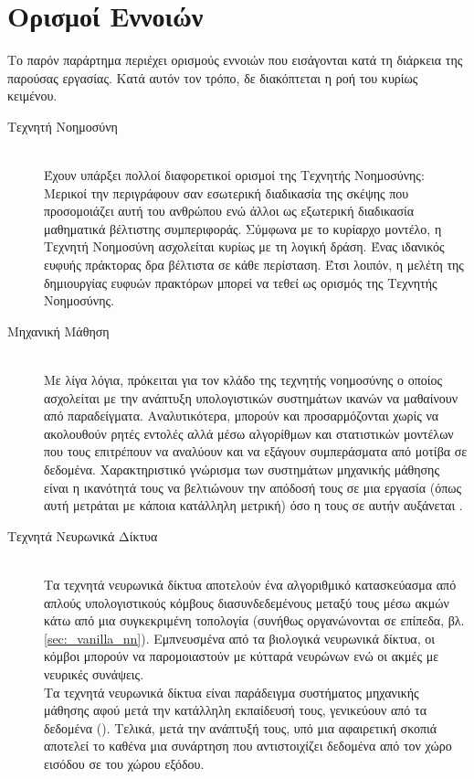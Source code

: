 \chapter{Ορισμοί Εννοιών}
\label{chap:definitions}
Το παρόν παράρτημα περιέχει ορισμούς εννοιών που εισάγονται κατά τη διάρκεια της παρούσας εργασίας. Κατά αυτόν τον τρόπο, δε διακόπτεται η ροή του κυρίως κειμένου. \cite{russell2020artificial,goodfellow2016deep,geron2019hands, bishop2006pattern} 

\begin{description}
    \item[Τεχνητή Νοημοσύνη] \hfill \\ 
    Έχουν υπάρξει πολλοί διαφορετικοί ορισμοί της Τεχνητής Νοημοσύνης: Μερικοί την περιγράφουν σαν εσωτερική διαδικασία της σκέψης που προσομοιάζει αυτή του ανθρώπου ενώ άλλοι ως εξωτερική διαδικασία μαθηματικά βέλτιστης συμπεριφοράς. Σύμφωνα με το κυρίαρχο μοντέλο, η Τεχνητή Νοημοσύνη ασχολείται κυρίως με τη λογική δράση. Ένας ιδανικός ευφυής πράκτορας δρα βέλτιστα σε κάθε περίσταση. Έτσι λοιπόν, η μελέτη της δημιουργίας ευφυών πρακτόρων μπορεί να τεθεί ως ορισμός της Τεχνητής Νοημοσύνης.
    \item[Μηχανική Μάθηση] \hfill \\ 
    Με λίγα λόγια, πρόκειται για τον κλάδο της τεχνητής νοημοσύνης ο οποίος ασχολείται με την ανάπτυξη υπολογιστικών συστημάτων ικανών να μαθαίνουν από παραδείγματα. Αναλυτικότερα, μπορούν και προσαρμόζονται χωρίς να ακολουθούν ρητές εντολές αλλά μέσω αλγορίθμων και στατιστικών μοντέλων που τους επιτρέπουν να αναλύουν και να εξάγουν συμπεράσματα από μοτίβα σε δεδομένα. Χαρακτηριστικό γνώρισμα των συστημάτων μηχανικής μάθησης είναι η ικανότητά τους να βελτιώνουν την απόδοσή τους σε μια εργασία (όπως αυτή μετράται με κάποια κατάλληλη μετρική) όσο η  τους σε αυτήν αυξάνεται \cite{mitchell1997machine}.
    \item[Τεχνητά Νευρωνικά Δίκτυα] \hfill \\ 
    Τα τεχνητά νευρωνικά δίκτυα αποτελούν ένα αλγοριθμικό κατασκεύασμα από απλούς υπολογιστικούς κόμβους διασυνδεδεμένους μεταξύ τους μέσω ακμών κάτω από μια συγκεκριμένη τοπολογία (συνήθως οργανώνονται σε επίπεδα, βλ. \ref{sec:_vanilla_nn}). Εμπνευσμένα από τα βιολογικά νευρωνικά δίκτυα, οι κόμβοι μπορούν να παρομοιαστούν με κύτταρά νευρώνων ενώ οι ακμές με νευρικές συνάψεις. \\
    Τα τεχνητά νευρωνικά δίκτυα είναι παράδειγμα συστήματος μηχανικής μάθησης αφού μετά την κατάλληλη εκπαίδευσή τους, γενικεύουν από τα δεδομένα (). Τελικά, μετά την ανάπτυξή τους, υπό μια αφαιρετική σκοπιά αποτελεί το καθένα μια συνάρτηση που αντιστοιχίζει δεδομένα από τον χώρο εισόδου σε  του χώρου εξόδου.

\end{description}

